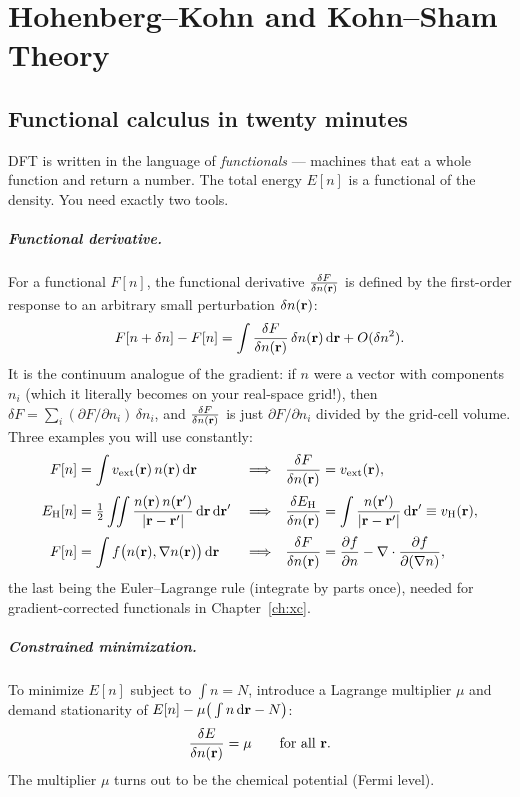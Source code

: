 \chapter{Hohenberg--Kohn and Kohn--Sham Theory}
\label{ch:hkks}

\section{Functional calculus in twenty minutes}

DFT is written in the language of \emph{functionals} --- machines that eat a
whole function and return a number. The total energy $E[n]$ is a functional
of the density. You need exactly two tools.

\paragraph{Functional derivative.} For a functional $F[n]$, the functional
derivative $\frac{\delta F}{\delta n(\mathbf{r})}$ is defined by the first-order response to an
arbitrary small perturbation $\delta n(\mathbf{r})$:
\begin{equation}
F[n + \delta n] - F[n]
= \int \frac{\delta F}{\delta n(\mathbf{r})}\,\delta n(\mathbf{r})\, \mathrm{d}\mathbf{r} + O(\delta n^2).
\label{eq:funcderivdef}
\end{equation}
It is the continuum analogue of the gradient: if $n$ were a vector with
components $n_i$ (which it literally becomes on your real-space grid!), then
$\delta F = \sum_i (\partial F/\partial n_i)\,\delta n_i$, and
$\frac{\delta F}{\delta n(\mathbf{r})}$ is just $\partial F/\partial n_i$ divided by the grid-cell
volume. Three examples you will use constantly:
\begin{align}
F[n] &= \int v_{\mathrm{ext}}(\mathbf{r})\,n(\mathbf{r})\,\mathrm{d}\mathbf{r}
&&\Longrightarrow&
\frac{\delta F}{\delta n(\mathbf{r})} &= v_{\mathrm{ext}}(\mathbf{r}),
\\[2pt]
E_{\mathrm H}[n] &= \tfrac12 \iint
\frac{n(\mathbf{r})\,n(\mathbf{r}')}{|\mathbf{r} - \mathbf{r}'|}\, \mathrm{d}\mathbf{r}\, \mathrm{d}\mathbf{r}'
&&\Longrightarrow&
\frac{\delta E_{\mathrm H}}{\delta n(\mathbf{r})} &= \int \frac{n(\mathbf{r}')}{|\mathbf{r}-\mathbf{r}'|}\,\mathrm{d}\mathbf{r}'
\equiv v_{\mathrm{H}}(\mathbf{r}),
\label{eq:hartreederiv}
\\[2pt]
F[n] &= \int f\big(n(\mathbf{r}), \nabla n(\mathbf{r})\big)\, \mathrm{d}\mathbf{r}
&&\Longrightarrow&
\frac{\delta F}{\delta n(\mathbf{r})} &= \frac{\partial f}{\partial n} - \nabla\cdot\frac{\partial f}{\partial (\nabla n)},
\label{eq:gradientfd}
\end{align}
the last being the Euler--Lagrange rule (integrate by parts once), needed for
gradient-corrected functionals in Chapter~\ref{ch:xc}.

\paragraph{Constrained minimization.} To minimize $E[n]$ subject to
$\int n = N$, introduce a Lagrange multiplier $\mu$ and demand
stationarity of $E[n] - \mu\big(\int n\,\mathrm{d}\mathbf{r} - N\big)$:
\begin{equation}
\frac{\delta E}{\delta n(\mathbf{r})} = \mu \qquad \text{for all } \mathbf{r}.
\label{eq:eulerlagrange}
\end{equation}
The multiplier $\mu$ turns out to be the chemical potential (Fermi level).

